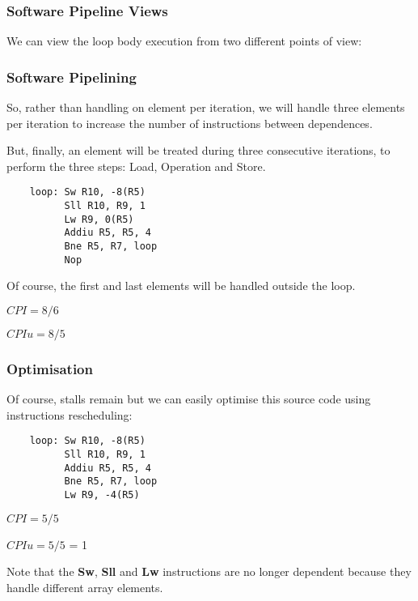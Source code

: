 
\begin{frame}
  \frametitle{Software Pipeline Views}

  We can view the loop body execution from two different points of view:

  \begin{center}
  \end{center}
\end{frame}


\begin{frame}[containsverbatim]
  \frametitle{Software Pipelining}

  So, rather than handling on element per iteration, we will handle
  three elements per iteration to increase the number of instructions
  between dependences.

  \-

  But, finally, an element will be treated during three consecutive
  iterations, to perform the three steps: Load, Operation and Store.

  \begin{verbatim}
    loop: Sw R10, -8(R5)
          Sll R10, R9, 1
          Lw R9, 0(R5)
          Addiu R5, R5, 4
          Bne R5, R7, loop
          Nop
  \end{verbatim}

  Of course, the first and last elements will be handled outside the loop.

  \-

  $CPI = 8 / 6$

  $CPIu = 8 / 5$
\end{frame}


\begin{frame}[containsverbatim]
  \frametitle{Optimisation}

  Of course, stalls remain but we can easily optimise this source code
  using instructions rescheduling:

  \begin{verbatim}
    loop: Sw R10, -8(R5)
          Sll R10, R9, 1
          Addiu R5, R5, 4
          Bne R5, R7, loop
          Lw R9, -4(R5)
  \end{verbatim}

  \-

  $CPI = 5 / 5$

  $CPIu = 5 / 5$ \alert{= 1}

  \-

  Note that the \textbf{Sw}, \textbf{Sll} and \textbf{Lw} instructions
  are no longer dependent because they handle different array elements.
\end{frame}

